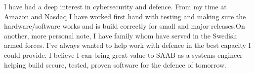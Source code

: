 \documentclass[../../main.tex]{subfiles}
\begin{document}
I have had a deep interest in cybersecurity and defence. From my time at Amazon and Nasdaq I have worked first hand with testing and making sure the hardware/software works and is build correctly for small and major releases.On another, more personal note, I have family whom have served in the Swedish armed forces. I've always wanted to help work with defence in the best capacity I could provide. I believe I can bring great value to SAAB as a systems engineer helping build secure, tested, proven software for the defence of tomorrow.
\\
\end{document}
